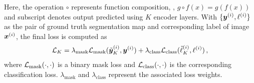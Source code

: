 Here, the operation $\circ$ represents function composition, \eg, $g\circ f(x) = g(f(x))$ and subscript denotes output predicted using $K$ encoder layers. With $\{\bm{y}^{(i)}, \ell^{(i)}\}$ as the pair of ground truth segmentation map and corresponding label of image ${\bm{x}}^{(i)}$, the final loss \cite{cheng2021mask2former} is computed as
\begin{align}
    \mathcal{L}_K = \lambda_{\text{mask}}\mathcal{L}_{\text{mask}}(\tilde{\bm{y}}_K^{(i)}, \bm{y}^{(i)}) + \lambda_{\text{class}}\mathcal{L}_{\text{class}}(\tilde{\ell}_K^{(i)}, \ell^{(i)} )\,,
    \label{eq:orig_loss}
\end{align}
where $\mathcal{L}_{\text{mask}}(\cdot,\cdot)$ is a binary mask loss and $\mathcal{L}_{\text{class}}(\cdot,\cdot)$ is the corresponding classification loss. $\lambda_{\text{mask}}$ and $\lambda_{\text{class}}$ represent the associated loss weights.
%
